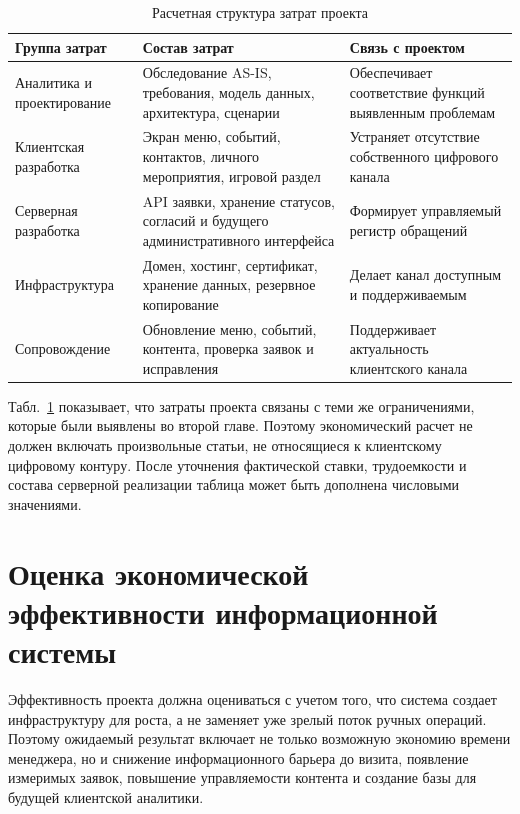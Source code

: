 \begin{table}[H]
\centering
\small
\caption{Расчетная структура затрат проекта}
\label{tab:ch3_cost_structure}
\begin{tabularx}{\textwidth}{|>{\raggedright\arraybackslash}p{}|>{\raggedright\arraybackslash}p{}|>{\raggedright\arraybackslash}X|}
\hline
\textbf{Группа затрат} & \textbf{Состав затрат} & \textbf{Связь с проектом} \\ \hline
Аналитика и проектирование & Обследование AS-IS, требования, модель данных, архитектура, сценарии & Обеспечивает соответствие функций выявленным проблемам \\ \hline
Клиентская разработка & Экран меню, событий, контактов, личного мероприятия, игровой раздел & Устраняет отсутствие собственного цифрового канала \\ \hline
Серверная разработка & API заявки, хранение статусов, согласий и будущего административного интерфейса & Формирует управляемый регистр обращений \\ \hline
Инфраструктура & Домен, хостинг, сертификат, хранение данных, резервное копирование & Делает канал доступным и поддерживаемым \\ \hline
Сопровождение & Обновление меню, событий, контента, проверка заявок и исправления & Поддерживает актуальность клиентского канала \\ \hline
\end{tabularx}
\normalsize
\end{table}

Табл.~\ref{tab:ch3_cost_structure} показывает, что затраты проекта связаны с теми же ограничениями, которые были выявлены во второй главе. Поэтому экономический расчет не должен включать произвольные статьи, не относящиеся к клиентскому цифровому контуру. После уточнения фактической ставки, трудоемкости и состава серверной реализации таблица может быть дополнена числовыми значениями.

\section{Оценка экономической эффективности информационной системы}

Эффективность проекта должна оцениваться с учетом того, что система создает инфраструктуру для роста, а не заменяет уже зрелый поток ручных операций. Поэтому ожидаемый результат включает не только возможную экономию времени менеджера, но и снижение информационного барьера до визита, появление измеримых заявок, повышение управляемости контента и создание базы для будущей клиентской аналитики.

